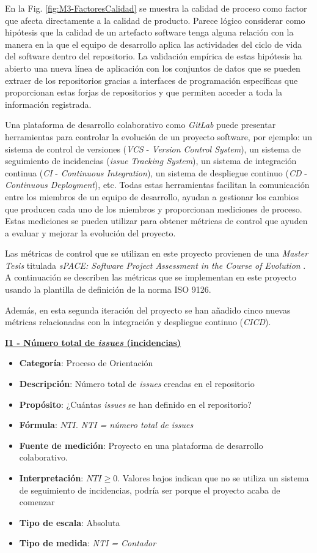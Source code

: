 En la Fig. \ref{fig:M3-FactoresCalidad} se muestra la calidad de proceso como factor que afecta directamente a la calidad de producto. Parece lógico considerar como hipótesis que la calidad de un artefacto software tenga alguna relación con la manera en la que el equipo de desarrollo aplica las actividades del ciclo de vida del software dentro del repositorio. La validación empírica de estas  hipótesis ha abierto una nueva línea de aplicación con los conjuntos de datos que se pueden extraer de los repositorios gracias a interfaces de programación específicas que proporcionan estas forjas de repositorios y que permiten acceder a toda la información registrada.

Una plataforma de desarrollo colaborativo como \textit{GitLab} puede presentar herramientas para controlar la evolución de un proyecto software, por ejemplo: un sistema de control de versiones (\textit{VCS} - \textit{Version Control System}), un sistema de seguimiento de incidencias (\textit{issue Tracking System}), un sistema de integración continua (\textit{CI} - \textit{Continuous Integration}), un sistema de despliegue continuo (\textit{CD} - \textit{Continuous Deployment}), etc.
Todas estas herramientas facilitan la comunicación entre los miembros de un equipo de desarrollo, ayudan a gestionar los cambios que producen cada uno de los miembros y proporcionan mediciones de proceso. Estas mediciones se pueden utilizar para obtener métricas de control que ayuden a evaluar y mejorar la evolución del proyecto.

Las métricas de control que se utilizan en este proyecto provienen de una \textit{Master Tesis} titulada \textit{sPACE: Software Project Assessment in the Course of Evolution} \cite{ratzinger_space:_2007}. 
A continuación se describen las métricas que se implementan en este proyecto usando la plantilla de definición de la norma ISO 9126.

Además, en esta segunda iteración del proyecto se han añadido cinco nuevas métricas relacionadas con la integración y despliegue continuo (\textit{CICD}).
 
\textbf{\underline{I1 - Número total de \textit{issues} (incidencias)}}

\begin{itemize}
	\item \textbf{Categoría}: Proceso de Orientación
	\item \textbf{Descripción}: Número total de \textit{issues} creadas en el repositorio
	\item \textbf{Propósito}: ¿Cuántas \textit{issues} se han definido en el repositorio?
	\item \textbf{Fórmula}: $NTI$. \textit{NTI = número total de \textit{issues}}
	\item \textbf{Fuente de medición}: Proyecto en una plataforma de desarrollo colaborativo.
	\item \textbf{Interpretación}: $NTI \geq 0$. Valores bajos indican que no se utiliza un sistema de seguimiento de incidencias, podría ser porque el proyecto acaba de comenzar
	\item \textbf{Tipo de escala}: Absoluta
	\item \textbf{Tipo de medida}: \textit{NTI = Contador}
\end{itemize}

